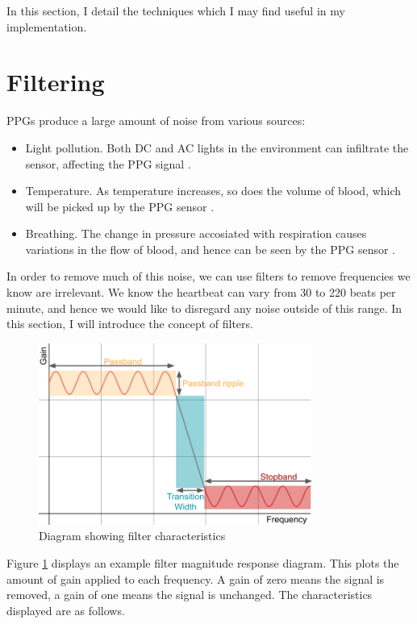 \documentclass[12pt,a4paper,twoside,openright]{report}
\begin{document}
In this section, I detail the techniques which I may find useful in my
implementation.

\section{Filtering} \label{sec:intro-filters}

PPGs produce a large amount of noise from various sources:
\begin{itemize}
	\item Light pollution. Both DC and AC lights in the environment can
		infiltrate the sensor, affecting the PPG signal \cite{kim15}.
	\item Temperature. As temperature increases, so does the volume of
		blood, which will be picked up by the PPG sensor 
		\cite{shin16}.
	\item Breathing. The change in pressure accosiated with respiration
		causes variations in the flow of blood, and hence can be seen
		by the PPG sensor \cite{allen02}.
\end{itemize}

In order to remove much of this noise, we can use filters to remove
frequencies we know are irrelevant. We know the heartbeat can vary from 
30 to 220 beats per minute, and hence we would like to disregard any noise 
outside of this range. In this section, I will introduce the concept of 
filters.

\begin{figure}[h!]
	\centerline{\includegraphics[width=0.8\textwidth]{figs/filter.png}}
\caption{Diagram showing filter characteristics}
\label{fig:filterdiag}
\end{figure}

Figure \ref{fig:filterdiag} displays an example filter magnitude response
diagram. This plots the amount of gain applied to each frequency. A gain of
zero means the signal is removed, a gain of one means the signal is unchanged.
The characteristics displayed are as follows.
\end{document}
